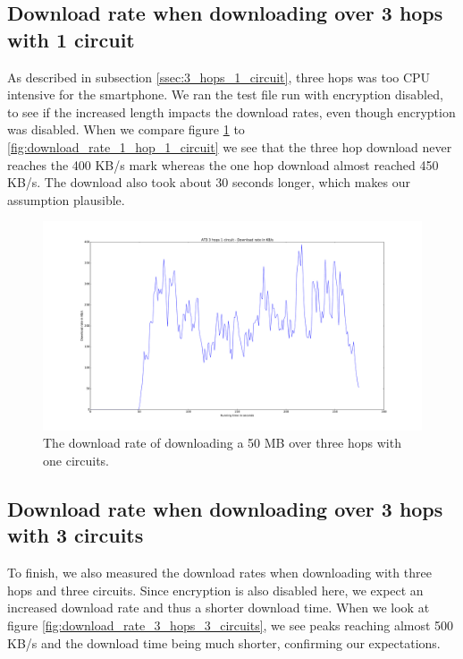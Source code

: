 		\subsection{Download rate when downloading over 3 hops with 1 circuit}
			As described in subsection \ref{ssec:3_hops_1_circuit}, three hops was too CPU intensive for the smartphone. We ran the test file run with encryption disabled, to see if the increased length impacts the download rates, even though encryption was disabled.
			When we compare figure \ref{fig:download_rate_3_hops_1_circuit} to \ref{fig:download_rate_1_hop_1_circuit} we see that the three hop download never reaches the 400 KB/s mark whereas the one hop download almost reached 450 KB/s. The download also took about 30 seconds longer, which makes our assumption plausible. 
			
			 \begin{figure}[!htb]
 				\centering
 				\includegraphics[width=\textwidth]{graphics/download_rate_3_hops_1_circuit.pdf}
 				\caption{The download rate of downloading a 50 MB over three hops with one circuits.}
 				\label{fig:download_rate_3_hops_1_circuit}
 			\end{figure}
 			
 		\subsection{Download rate when downloading over 3 hops with 3 circuits}
 			To finish, we also measured the download rates when downloading with three hops and three circuits. Since encryption is also disabled here, we expect an increased download rate and thus a shorter download time. When we look at figure \ref{fig:download_rate_3_hops_3_circuits}, we see peaks reaching almost 500 KB/s and the download time being much shorter, confirming our expectations.
 			
